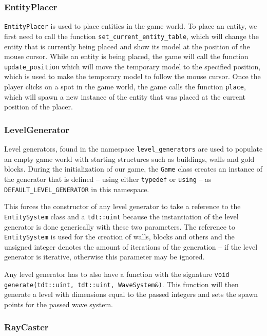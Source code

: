 \subsubsection{EntityPlacer}

\texttt{EntityPlacer} is used to place entities in the game world. To place an entity, we first need to call the function
\texttt{set\_current\_entity\_table}, which will change the entity that is currently being placed and show its model at the position
of the mouse cursor. While an entity is being placed, the game
will call the function \texttt{update\_position} which will move the temporary model to the specified position, which is used to make
the temporary model to follow the mouse cursor. Once the player clicks on a spot in the game world, the game calls the function
\texttt{place}, which will spawn a new instance of the entity that was placed at the current position of the placer.

\subsubsection{LevelGenerator}

Level generators, found in the namespace \texttt{level\_generators} are used to populate an empty game world with starting structures such
as buildings, walls and gold blocks. During the initialization of our game, the \texttt{Game} class creates an instance of the generator that
is defined -- using either \texttt{typedef} or \texttt{using} -- as \texttt{DEFAULT\_LEVEL\_GENERATOR} in this namespace.

This forces the constructor of any level generator to take a reference to the \texttt{EntitySystem} class and a \texttt{tdt::uint} because
the instantiation of the level generator is done generically with these two parameters. The reference to \texttt{EntitySystem} is used
for the creation of walls, blocks and others and the unsigned integer denotes the amount of iterations of the generation -- if the
level generator is iterative, otherwise this parameter may be ignored.

Any level generator has to also have a function with the signature \texttt{void generate(tdt::uint, tdt::uint, WaveSystem\&)}. This function
will then generate a level with dimensions equal to the passed integers and sets the spawn points for the passed wave system.

\subsubsection{RayCaster}

